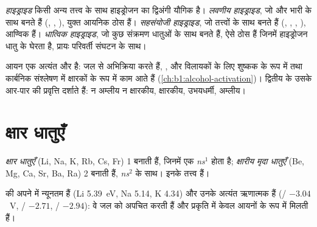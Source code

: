 \begin{definition}[हाइड्राइड]\label{def:b1:s-block:hydride}
\emph{हाइड्राइड} किसी अन्य तत्त्व के साथ हाइड्रोजन का
द्विअंगी यौगिक है। \emph{लवणीय हाइड्राइड}, जो
 और भारी  के साथ बनते हैं (, ,
),  युक्त आयनिक ठोस हैं। \emph{सहसंयोजी
हाइड्राइड}, जो  तत्त्वों के साथ बनते हैं
(, , , ), आण्विक हैं। \emph{धात्विक
हाइड्राइड}, जो कुछ संक्रमण धातुओं के साथ बनते हैं,
ऐसे ठोस हैं जिनमें हाइड्रोजन धातु  के  घेरता है, प्रायः
परिवर्ती संघटन के साथ।
\end{definition}

 आयन एक अत्यंत  और  है: 
जल से अभिक्रिया करते हैं, , और विलायकों के लिए
शुष्कक के रूप में तथा कार्बनिक संश्लेषण में क्षारकों के रूप में काम आते हैं (\cref{ch:b1:alcohol-activation})।
द्वितीय  के  उसके आर-पार  की
प्रवृत्ति दर्शाते हैं:  न अम्लीय न क्षारकीय, 
क्षारकीय,  उभयधर्मी,  अम्लीय।

\section{क्षार धातुएँ}

\begin{definition}[क्षार और क्षारीय मृदा धातुएँ]\label{def:b1:s-block:families}
\emph{क्षार धातुएँ} (Li, Na, K, Rb, Cs, Fr)  1
बनाती हैं, जिनमें एक  \textit{ns}$^1$ होता है;
\emph{क्षारीय मृदा धातुएँ} (Be, Mg, Ca, Sr,
Ba, Ra)  2 बनाती हैं, \textit{ns}$^2$ के साथ। इनके तत्त्व
 हैं।
\end{definition}

\begin{proposition}\label{prop:b1:s-block:reducing-power}
 की  अपने  में न्यूनतम हैं
(Li \qty{5.39}{eV}, Na 5.14, K 4.34) और उनके  अत्यंत ऋणात्मक हैं
(/ $-3.04$~V, / $-2.71$,
/ $-2.94$): वे जल को अपचित करती हैं और प्रकृति में केवल
 आयनों के रूप में मिलती हैं।
\end{proposition}

